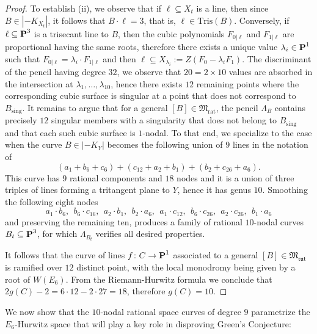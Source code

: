 \documentclass[11pt]{amsart}
\theoremstyle{definition}
\def\PP{{\textbf P}}
\begin{document}
\begin{proof}
To establish  (ii), we observe that if $\ell\subseteq X_t$ is a line, then since $B\in |-K_{X_t}|$, it follows that $B\cdot \ell=3$, that is, $\ell\in \mbox{Tris}(B)$. Conversely, if $\ell\subseteq \PP^3$ is a trisecant line to $B$, then the cubic polynomials $F_{0|\ell}$ and $F_{1|\ell}$ are proportional having the same roots, therefore there exists a unique value $\lambda_i\in \PP^1$ such that $F_{0|\ell}=\lambda_i\cdot F_{1|\ell}$ and then $\ell\subseteq X_{\lambda_i}:=Z(F_0-\lambda_iF_1)$. The discriminant of the pencil having degree $32$, we observe that $20=2\times 10$ values are absorbed in the intersection at $\lambda_1, \ldots, \lambda_{10}$, hence there exists $12$ remaining points where the corresponding cubic surface is singular at a point that does not correspond to $B_{\mathrm{sing}}$. It remains to argue that for a general $[B]\in \mathfrak{M}_{\mathrm{rat}}$, the pencil $\Lambda_B$ contains precisely $12$ singular members with a singularity that does not belong to $B_{\mathrm{sing}}$ and that each such cubic surface is $1$-nodal. To that end, we specialize to the case when the curve $B\in |-K_Y|$ becomes the following union of $9$ lines in the notation of \cite{Dol}
$$(a_1+b_6+c_6)+(c_{12}+a_2+b_1)+(b_2+c_{26}+a_6).$$
This curve has $9$ rational components and $18$ nodes and it is a union of three triples of lines forming a tritangent plane to $Y$, hence it has genus $10$. Smoothing the following eight nodes 
$$a_1\cdot b_6, \ \ b_6\cdot c_{16}, \ \ a_2\cdot b_1, \ \ b_2\cdot a_6, \ \  a_1\cdot c_{12}, \ \ b_6\cdot c_{26}, \ \ a_2\cdot c_{26}, \ \ b_1\cdot a_6$$
and preserving the remaining ten, produces a family of rational $10$-nodal curves $B_t\subseteq \PP^3$, for which $\Lambda_{B_t}$ verifies all desired properties.

\vskip 3pt

It follows that the curve of lines $f\colon C\rightarrow \PP^1$ associated to a general $[B]\in \mathfrak{M}_{\mathfrak{rat}}$ is ramified over $12$ distinct point, with the local monodromy being given by a root of $W(E_6)$. From the Riemann-Hurwitz formula we conclude that $2g(C)-2=6\cdot12-2\cdot 27=18$, therefore $g(C)=10$. 
\end{proof}

We now show that the $10$-nodal rational space curves of degree $9$ parametrize the $E_6$-Hurwitz space that will play a key role in disproving Green's Conjecture:
\end{document}

